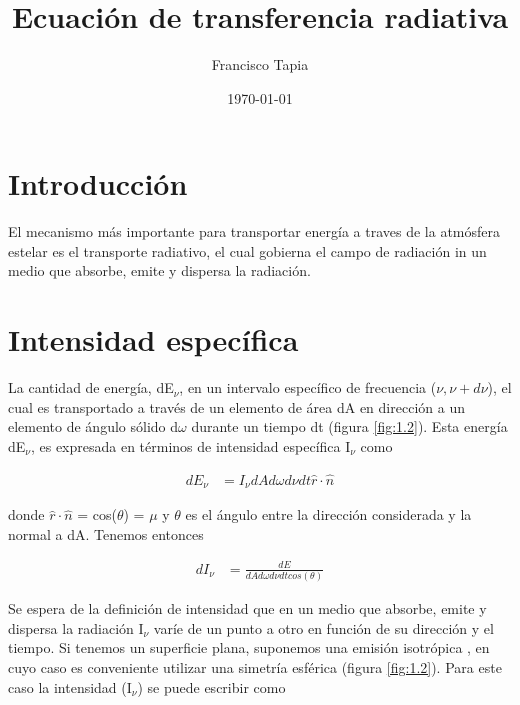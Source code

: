 \documentclass[a4paper]{article}
\title{Ecuación de transferencia radiativa}
\author{Francisco Tapia}
\date{\today}
\begin{document}
\maketitle

\section{Introducción}

El mecanismo más importante para transportar energía a traves de la atmósfera estelar es el transporte radiativo, el cual gobierna el campo de radiación in un medio que absorbe, emite y dispersa la radiación.

\section{Intensidad específica} 

La cantidad de energía, dE$_{\nu}$, en un intervalo específico de frecuencia ($\nu,\nu+d\nu$), el cual es transportado a través de un elemento de área dA en dirección a un elemento de ángulo sólido d$\omega$ durante un tiempo dt (figura \ref{fig:1.2}). Esta energía dE$_{\nu}$, es expresada en términos de intensidad específica I$_{\nu}$ como


\begin{equation} \label{eq1}
\begin{split}
    dE_{\nu} &= I_{\nu} dA d\omega d\nu dt \hat{r} \cdot \hat{n}
\end{split}
\end{equation}

donde $\hat{r} \cdot \hat{n}$ = cos($\theta$) = $\mu$ y $\theta$ es el ángulo entre la dirección considerada y la normal a dA. Tenemos entonces

\begin{equation} \label{eq2}
\begin{split}
   dI_\nu  & = \frac{dE}{dA d\omega d\nu dt cos(\theta)}
\end{split}
\end{equation}


Se espera de la definición de intensidad que en un medio que absorbe, emite y dispersa la radiación I$_{\nu}$ varíe de un punto a otro en función de su dirección y el tiempo. Si tenemos un superficie plana, suponemos una emisión isotrópica , en cuyo caso es conveniente utilizar una simetría esférica (figura \ref{fig:1.2}). Para este caso la intensidad (I$_{\nu}$) se puede escribir como
\end{document}
